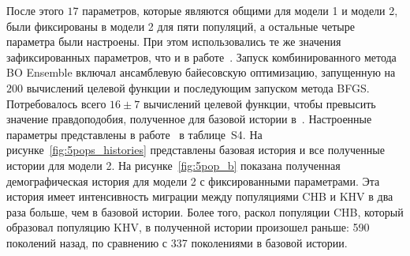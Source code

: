 После этого $17$ параметров, которые являются общими для модели 1 и модели 2, были фиксированы в модели 2 для пяти популяций, а остальные четыре параметра были настроены.
При этом использовались те же значения зафиксированных параметров, что и в работе~\cite{jouganous2017inferring}.
Запуск комбинированного метода BO Ensemble включал ансамблевую байесовскую оптимизацию, запущенную на $200$ вычислений целевой функции и последующим запуском метода BFGS.
Потребовалось всего $16\pm 7$ вычислений целевой функции, чтобы превысить значение правдоподобия, полученное для базовой истории в~\cite{jouganous2017inferring}.
Настроенные параметры представлены в работе~\cite{noskova2023bayesian} в таблице~S4.
На рисунке~\ref{fig:5pops_histories} представлены базовая история и все полученные истории для модели 2.
На рисунке~\ref{fig:5pop_b} показана полученная демографическая история для модели 2 с фиксированными параметрами.
Эта история имеет интенсивность миграции между популяциями CHB и KHV в два раза больше, чем в базовой истории.
Более того, раскол популяции CHB, который образовал популяцию KHV, в полученной истории произошел раньше: 590 поколений назад, по сравнению с 337 поколениями в базовой истории.

